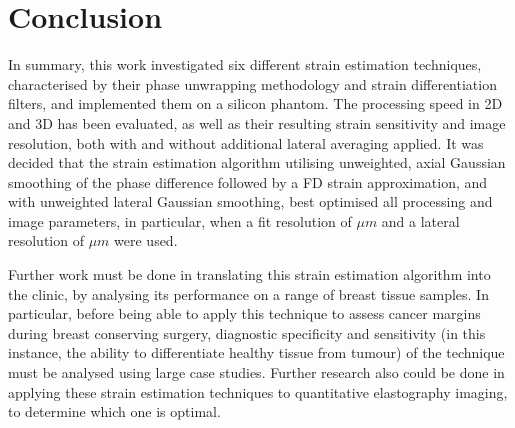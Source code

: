 
\section{Conclusion}

In summary, this work investigated six different strain estimation techniques, characterised by their phase unwrapping methodology and strain differentiation filters, and implemented them on a silicon phantom. The processing speed in 2D and 3D has been evaluated, as well as their resulting strain sensitivity and image resolution, both with and without additional lateral averaging applied. It was decided that the strain estimation algorithm utilising unweighted, axial Gaussian smoothing of the phase difference followed by a FD strain approximation, and with unweighted lateral Gaussian smoothing, best optimised all processing and image parameters, in particular, when a fit resolution of $\mu m$ and a lateral resolution of $\mu m$ were used.

Further work must be done in translating this strain estimation algorithm into the clinic, by analysing its performance on a range of breast tissue samples. In particular, before being able to apply this technique to assess cancer margins during breast conserving surgery, diagnostic specificity and sensitivity (in this instance, the ability to differentiate healthy tissue from tumour) of the technique must be analysed using large case studies. Further research also could be done in applying these strain estimation techniques to quantitative elastography imaging, to determine which one is optimal.


